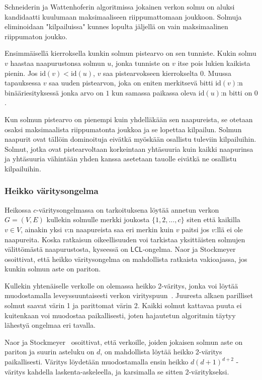\documentclass[12pt,finnish]{tktltiki2}
\theoremstyle{definition}
\theoremstyle{remark}
\newcommand*{\lcl}{\ensuremath{\mathsf{LCL}}}
\begin{document}
Schneiderin ja Wattenhoferin algoritmissa jokainen verkon solmu on aluksi kandidaatti kuulumaan maksimaaliseen riippumattomaan joukkoon. Solmuja eliminoidaan "kilpailuissa" kunnes lopulta jäljellä on vain maksimaalinen riippumaton joukko. 

Ensimmäisellä kierroksella kunkin solmun pistearvo on sen tunniste. Kukin solmu $v$ haastaa naapurustonsa solmun $u$, jonka tunniste on $v$ itse pois lukien kaikista pienin. Jos $\text{id}(v) < \text{id}(u)$, $v$ saa pistearvokseen kierrokselta $0$. Muussa tapauksessa $v$ saa uuden pistearvon, joka on eniten merkitsevä bitti $\text{id}(v)$:n binääriesityksessä jonka arvo on $1$ kun samassa paikassa oleva $\text{id}(u)$:n bitti on $0$.

Kun solmun pistearvo on pienempi kuin yhdelläkään sen naapureista, se otetaan osaksi maksimaalista riippumatonta joukkoa ja se lopettaa kilpailun. Solmun naapurit ovat tällöin dominoituja eivätkä myöskään osallistu tuleviin kilpailuihin. Solmut, jotka ovat pistearvoltaan korkeintaan yhtäsuuria kuin kaikki naapurinsa ja yhtäsuuria vähintään yhden kanssa asetetaan tauolle eivätkä ne osallistu kilpailuihin.


 
\iffalse
\subsubsection{Heikko väritysongelma}
Heikossa $c$-väritysongelmassa on tarkoituksena löytää annetun verkon $G = (V, E)$ kullekin solmulle merkki joukosta $\{1, 2, ..., c\}$ siten että kaikilla $v \in V$, ainakin yksi $v$:n naapureista saa eri merkin kuin $v$ paitsi jos $v$:llä ei ole naapureita. Koska ratkaisun oikeellisuuden voi tarkistaa yksittäisten solmujen välittömästä naapurustosta, kyseessä on \lcl -ongelma. Naor ja Stockmeyer~\cite{naor95} osoittivat, että heikko väritysongelma on mahdollista ratkaista vakioajassa, jos kunkin solmun aste on pariton.

Kullekin yhtenäiselle verkolle on olemassa heikko 2-väritys, jonka voi löytää muodostamalla leveyssuuntaisesti verkon virityspuun~\cite{naor95}. Juuresta alkaen parilliset solmut saavat värin 1 ja parittomat värin 2. Kaikki solmut kattavaa puuta ei kuitenkaan voi muodostaa paikallisesti, joten hajautetun algoritmin täytyy lähestyä ongelmaa eri tavalla.

Naor ja Stockmeyer~\cite{naor95} osoittivat, että verkoille, joiden jokaisen solmun aste on pariton ja suurin asteluku on $d$, on mahdollista löytää heikko 2-väritys paikallisesti. Väritys löydetään muodostamalla ensin heikko $d(d + 1)^{d+2}$ -väritys kahdella laskenta-askeleella, ja karsimalla se sitten 2-väritykseksi.
\end{document}
